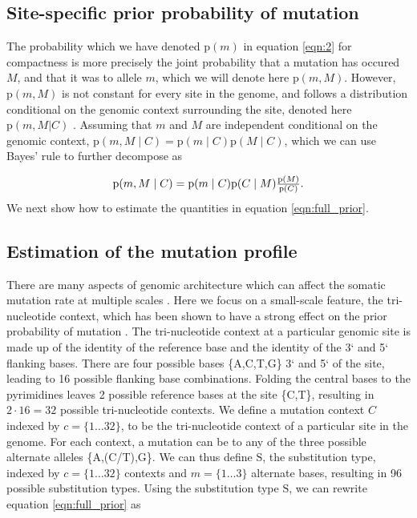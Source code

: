 \documentclass[a4,center,fleqn]{NAR}
\begin{document}
\subsection{Site-specific prior probability of mutation}
The probability which we have denoted $\mathrm{p}(m)$ in equation \ref{eqn:2} for compactness is more precisely the joint probability that a mutation has occured $M$, and that it was to allele $m$, which we will denote here $\mathrm{p}(m,M)$.
However, $\mathrm{p}(m,M)$ is not constant for every site in the genome, and follows a distribution conditional on the genomic context surrounding the site, denoted here $\mathrm{p}(m,M | C)$ \cite{Buisson2019}.
Assuming that $m$ and $M$ are independent conditional on the genomic context, $\mathrm{p}(m,M \mid C) = \mathrm{p}(m \mid C) \mathrm{p}(M \mid C)$, which we can use Bayes' rule to further decompose as 

\begin{equation}
  \label{eqn:full_prior}
  $$
  \mathrm{p}(m,M \mid C) = \mathrm{p}(m \mid C) \mathrm{p}(C \mid M)\frac{\mathrm{p}(M)}{\mathrm{p}(C)}.
  $$
\end{equation}
We next show how to estimate the quantities in equation \ref{eqn:full_prior}.

\subsection{Estimation of the mutation profile}
There are many aspects of genomic architecture which can affect the somatic mutation rate at multiple scales \cite{Buisson2019}.
Here we focus on a small-scale feature, the tri-nucleotide context, which has been shown to have a strong effect on the prior probability of mutation \citep{Nik-Zainal2012a,Alexandrov2015,Lee-Six2018}.
The tri-nucleotide context at a particular genomic site is made up of the identity of the reference base and the identity of the 3` and 5` flanking bases.
There are four possible bases {\{A,C,T,G\}} 3` and 5` of the site, leading to 16 possible flanking base combinations.
Folding the central bases to the pyrimidines leaves 2 possible reference bases at the site {\{C,T\}}, resulting in $2 \cdot 16 = 32$ possible tri-nucleotide contexts.
We define a mutation context $C$ indexed by $c=\{1 \dots 32\}$, to be the tri-nucleotide context of a particular site in the genome. 
For each context, a mutation can be to any of the three possible alternate alleles {\{A,(C/T),G\}}. 
We can thus define $\mathrm{S}$, the substitution type, indexed by $c=\{1 \dots 32\}$ contexts and $m = \{1 \dots 3\}$ alternate bases, resulting in 96 possible substitution types.
Using the substitution type $\mathrm{S}$, we can rewrite equation \ref{eqn:full_prior} as 
\end{document}
